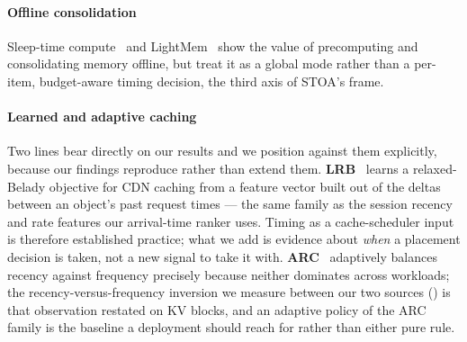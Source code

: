 \paragraph{Offline consolidation}
Sleep-time compute~\cite{F3_lin2025sleeptime} and LightMem~\cite{F4_fang2025lightmem} show the value of
precomputing and consolidating memory offline, but treat it as a global mode rather than a per-item,
budget-aware timing decision, the third axis of STOA's frame.

\paragraph{Learned and adaptive caching}
Two lines bear directly on our results and we position against them explicitly, because our findings
reproduce rather than extend them. \textbf{LRB}~\cite{S6_song2020lrb} learns a relaxed-Belady objective
for CDN caching from a feature vector built out of the deltas between an object's past request
times --- the same family as the session recency and rate features our arrival-time ranker uses. Timing as a
cache-scheduler input is therefore established practice; what we add is evidence about \emph{when} a
placement decision is taken, not a new signal to take it with. \textbf{ARC}~\cite{S7_megiddo2003arc} adaptively balances recency against
frequency precisely because neither dominates across workloads; the recency-versus-frequency inversion we
measure between our two sources () is that observation restated on KV blocks, and an
adaptive policy of the ARC family is the baseline a deployment should reach for rather than either pure
rule.

